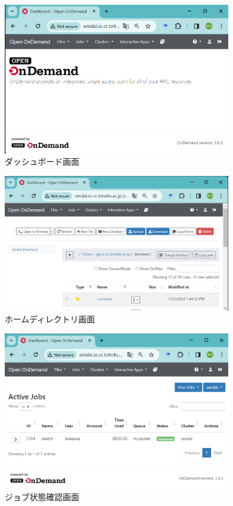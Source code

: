 \begin{figure}[tb]
    \centering
    \includegraphics[width=100mm]{./fig/dashboard.png}
    \caption{ダッシュボード画面}
    \label{dashboard}
\end{figure}

\begin{figure}[tb]
    \centering
    \includegraphics[width=100mm]{./fig/homedirectory.png}
    \caption{ホームディレクトリ画面}
    \label{homedirectory}
\end{figure}

\begin{figure}[tb]
    \centering
    \includegraphics[width=100mm]{./fig/activejobs.png}
    \caption{ジョブ状態確認画面}
    \label{activejobs}
\end{figure}


